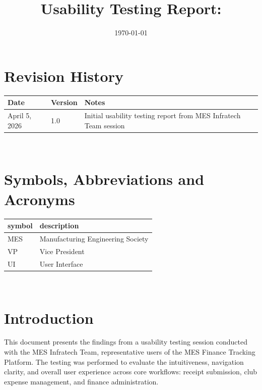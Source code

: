 \documentclass[12pt, titlepage]{article}
\begin{document}
\title{Usability Testing Report: \progname} 
\author{\authname}
\date{\today}
	
\maketitle


\section{Revision History}

\begin{tabularx}{\textwidth}{p{3cm}p{2cm}X}
\toprule {\bf Date} & {\bf Version} & {\bf Notes}\\
\midrule
April 5, 2026 & 1.0 & Initial usability testing report from MES Infratech Team session\\
\bottomrule
\end{tabularx}

~\newpage

\section{Symbols, Abbreviations and Acronyms}

\renewcommand{\arraystretch}{1.2}
\begin{tabular}{l l} 
  \toprule		
  \textbf{symbol} & \textbf{description}\\
  \midrule 
  MES & Manufacturing Engineering Society\\
  VP & Vice President\\
  UI & User Interface\\
  \bottomrule
\end{tabular}\\

\newpage

\tableofcontents

\newpage


\section{Introduction}

This document presents the findings from a usability testing session conducted with the MES Infratech Team, representative users of the MES Finance Tracking Platform. The testing was performed to evaluate the intuitiveness, navigation clarity, and overall user experience across core workflows: receipt submission, club expense management, and finance administration.
\end{document}
